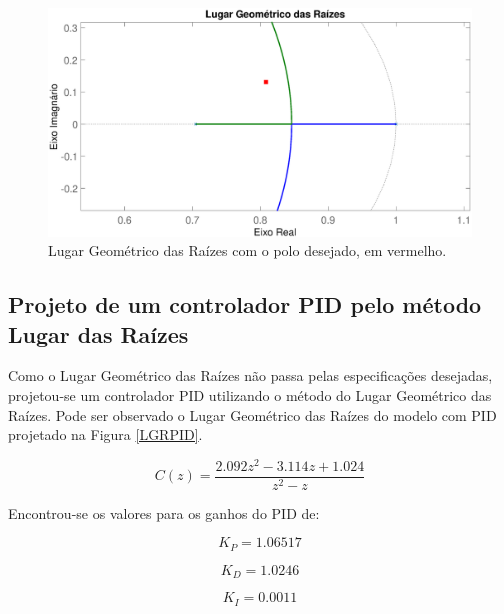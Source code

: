 \documentclass[conference,harvard,brazil,english]{sbatex}
\begin{document}
            \begin{figure}[!htb] 
                \centering \includegraphics[width=\columnwidth]{imagens/lgr.eps}{
                    \small
                    \centering
                    \caption{Lugar Geométrico das Raízes com o polo desejado, em vermelho.}
                \label{LGR}}
            \end{figure}
        
        \subsection{Projeto de um controlador PID pelo método Lugar das Raízes}
        
            Como o Lugar Geométrico das Raízes não passa pelas especificações desejadas, projetou-se um controlador PID utilizando o método do Lugar Geométrico das Raízes. Pode ser observado o Lugar Geométrico das Raízes do modelo com PID projetado na Figura \ref{LGRPID}.
            
            \begin{equation}
                C(z)=\frac{2.092z^2-3.114z+1.024}{z^2-z}
            \end{equation}
            
            Encontrou-se os valores para os ganhos do PID de:
            
            \begin{equation}
                K_P=1.06517
            \end{equation}
            
            \begin{equation}
                K_D=1.0246
            \end{equation}
            
            \begin{equation}
                K_I=0.0011
            \end{equation}
            
\end{document}
